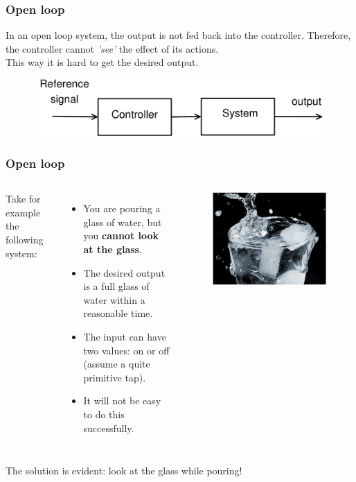 \documentclass{beamer}
\begin{document}
\begin{frame}
\frametitle{Open loop}
\vspace{-4ex}
In an open loop system, the output is not fed back into the controller. Therefore, the controller cannot \textit{'see'} the effect of its actions. \\
This way it is hard to get the desired output.\\
\bigskip
\begin{figure}
\includegraphics[width=1\linewidth]{open_loop}
\end{figure}
\end{frame}


\begin{frame}
\frametitle{Open loop}
\begin{columns}[c]

Take for example the following system:\\
\begin{itemize}
\item You are pouring a glass of water, but you \textbf{cannot look at the glass}.
\item The desired output is a full glass of water within a reasonable time.
\item The input can have two values: on or off (assume a quite primitive tap).
\item It will not be easy to do this successfully.
\end{itemize}

\begin{figure}
\includegraphics[width=1\linewidth]{glass}
\end{figure}

\end{columns}
\bigskip
The solution is evident: look at the glass while pouring!
\end{frame}
\end{document}
